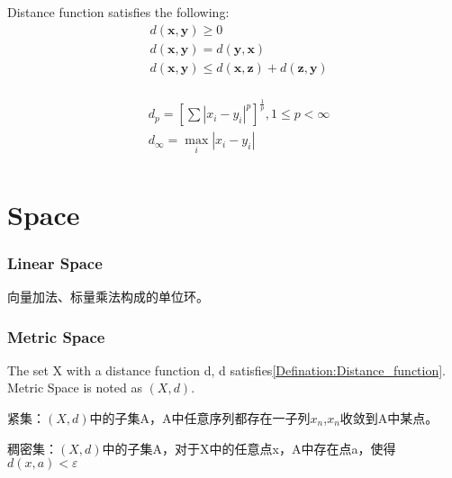 \documentclass[UTF8]{../../09-Mathematics}
\begin{document}
Distance function satisfies the following:
\begin{equation}\label{Defination:Distance_function}
    \begin{split}
    &d(\boldsymbol x, \boldsymbol y) \geqslant 0\\
    &d(\boldsymbol x, \boldsymbol y) = d(\boldsymbol y, \boldsymbol x)\\
    &d(\boldsymbol x, \boldsymbol y) \leqslant d(\boldsymbol x, \boldsymbol z) + d(\boldsymbol z, \boldsymbol y)\\
\end{split}
\end{equation}

\begin{equation}
    \begin{split}
    &d_p = [\sum |x_i-y_i|^p]^{\frac{1}{p}}, 1\leqslant p < \infty\\
    & d_{\infty} = \max_i|x_i-y_i|\\
\end{split}
\end{equation}

\chapter{Space}


\subsection{Linear Space}

向量加法、标量乘法构成的单位环。


\subsection{Metric Space}

\begin{definition}
    The set X with a distance function d, d satisfies\ref{Defination:Distance_function}. Metric Space is noted as $(X,d)$.
\end{definition}

\begin{definition}
    紧集：$(X,d)$中的子集A，A中任意序列都存在一子列$x_n$,$x_n$收敛到A中某点。
\end{definition}

\begin{definition}
    稠密集：$(X,d)$中的子集A，对于X中的任意点x，A中存在点a，使得$d(x,a)< \varepsilon $
\end{definition}
\end{document}
